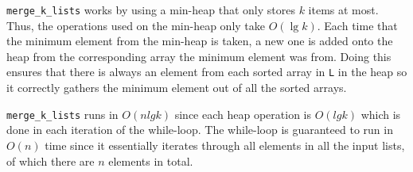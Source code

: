 \documentclass[11pt]{article}
\theoremstyle{claim}
\begin{document}
\noindent
\texttt{merge\_k\_lists} works by using a min-heap that only stores \(k\) items at most. Thus, the operations used on the min-heap only take \(O(\lg k)\). Each time that the minimum element from the min-heap is taken, a new one is added onto the heap from the corresponding array the minimum element was from. Doing this ensures that there is always an element from each sorted array in \texttt{L} in the heap so it correctly gathers the minimum element out of all the sorted arrays.

\noindent
\texttt{merge\_k\_lists} runs in \(O(n lg k)\) since each heap operation is \(O(lg k)\) which is done in each iteration of the while-loop. The while-loop is guaranteed to run in \(O(n)\) time since it essentially iterates through all elements in all the input lists, of which there are \(n\) elements in total.
\end{document}
